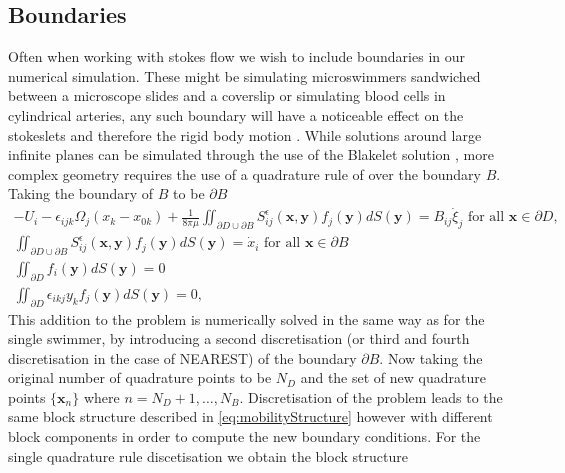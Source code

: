 \subsection{Boundaries}
Often when working with stokes flow we wish to include boundaries in our numerical simulation. These might be simulating microswimmers sandwiched between a microscope slides and a coverslip \cite{Gallagher2019RapidAnalysis} or simulating blood cells in cylindrical arteries, any such boundary will have a noticeable effect on the stokeslets and therefore the rigid body motion \cite{Liron1981ExistenceBoundaries}. While solutions around large infinite planes can be simulated through the use of the Blakelet solution \cite{Ainley2008TheStokeslets,Cortez2015}, more complex geometry requires the use of a quadrature rule of over the boundary $B$. Taking the boundary of $B$ to be $\partial B$
\begin{equation}
\label{eq:MobilityProblemBnd}
\begin{gathered}
    -U_{i}-\epsilon_{i j k} \Omega_{j}\left(x_{k}-x_{0 k}\right)+\frac{1}{8 \pi\mu} \iint_{\partial D \cup \partial B} S_{i j}^{\epsilon}(\bm{x}, \bm{y}) f_{j}(\bm{y}) d S({\bm{y}})=B_{i j} \dot{\xi}_{j} \text { for all } \bm{x} \in \partial D, \\
    \iint_{\partial D \cup \partial B} S_{i j}^{\epsilon}(\bm{x}, \bm{y}) f_{j}(\bm{y}) d S({\bm{y}}) = \dot{x}_i \text { for all } \bm{x} \in \partial B \\
    \iint_{\partial D} f_{i}(\bm{y}) d S({\bm{y}})=0 \\
    \iint_{\partial D} \epsilon_{i k j} y_{k} f_{j}(\bm{y}) d S({\bm{y}})=0,
\end{gathered}
\end{equation}
This addition to the problem is numerically solved in the same way as for the single swimmer, by introducing a second discretisation (or third and fourth discretisation in the case of NEAREST) of the boundary $\partial B$. Now taking the original number of quadrature points to be $N_D$ and the set of new quadrature points $\{\bm{x}_n\}$ where $n=N_D+1,\dots,N_B$. Discretisation of the problem leads to the same block structure described in \cref{eq:mobilityStructure} however with different block components in order to compute the new boundary conditions. For the single quadrature rule discetisation we obtain the block structure
